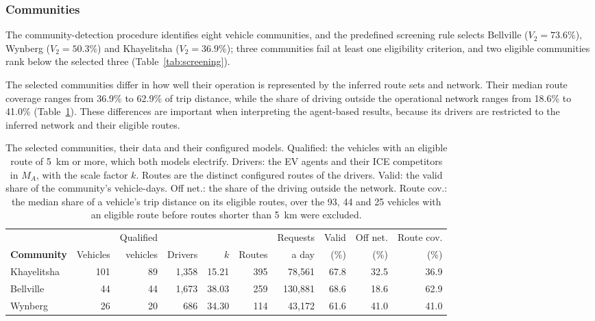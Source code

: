 \documentclass{elsarticle}
\newcommand{\MA}{\ensuremath{M_A}}
\begin{document}
\subsubsection{Communities}

The community-detection procedure identifies eight vehicle communities, and the predefined screening rule selects Bellville (\(V_2=73.6\%\)), Wynberg (\(V_2=50.3\%\)) and Khayelitsha (\(V_2=36.9\%\)); three communities fail at least one eligibility criterion, and two eligible communities rank below the selected three (Table~\ref{tab:screening}).

The selected communities differ in how well their operation is represented by the inferred route sets and network. Their median route coverage ranges from 36.9\% to 62.9\% of trip distance, while the share of driving outside the operational network ranges from 18.6\% to 41.0\% (Table~\ref{tab:models}). These differences are important when interpreting the agent-based results, because its drivers are restricted to the inferred network and their eligible routes.

\begin{table}[htbp]
    \centering
    \footnotesize
    \caption[The selected communities, their data and their configured models]{The selected communities, their data and their configured models. Qualified: the vehicles with an eligible route of 5~km or more, which both models electrify. Drivers: the EV agents and their ICE competitors in \MA, with the scale factor $k$. Routes are the distinct configured routes of the drivers. Valid: the valid share of the community's vehicle-days. Off net.: the share of the driving outside the network. Route cov.: the median share of a vehicle's trip distance on its eligible routes, over the 93, 44 and 25 vehicles with an eligible route before routes shorter than 5~km were excluded.}
    \label{tab:models}
    \begin{tabularx}{\linewidth}{@{}Xrrrrrrrrr@{}}
        \toprule
        & & Qualified & & & & Requests & Valid & Off net. & Route cov. \\
        \textbf{Community} & Vehicles & vehicles & Drivers & $k$ & Routes & a day & (\%) & (\%) & (\%) \\
        \midrule
        Khayelitsha & 101 & 89 & 1,358 & 15.21 & 395 & 78,561 & 67.8 & 32.5 & 36.9 \\
        Bellville & 44 & 44 & 1,673 & 38.03 & 259 & 130,881 & 68.6 & 18.6 & 62.9 \\
        Wynberg & 26 & 20 & 686 & 34.30 & 114 & 43,172 & 61.6 & 41.0 & 41.0 \\
        \bottomrule
    \end{tabularx}
\end{table}
\end{document}
